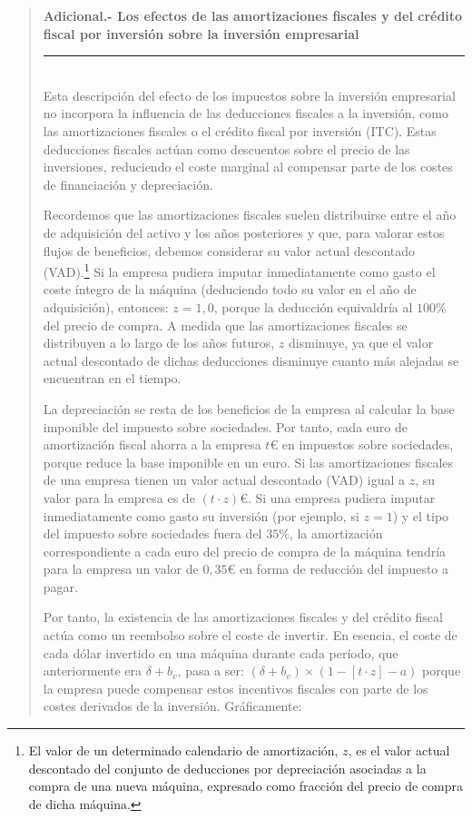 \documentclass[10pt,a4paper]{article}
\newenvironment{specialblock}[1]{%
      \begin{quote} %
      \small %
      \noindent\textbf{#1}\\[-0.3em] %
      \rule{\linewidth}{0.4pt}\\[0.6em]}{
      \end{quote}}
\begin{document}
\begin{specialblock}{\textbf{Adicional.-} Los efectos de las amortizaciones fiscales y del crédito fiscal por inversión sobre la inversión empresarial}
    Esta descripción del efecto de los impuestos sobre la inversión empresarial no incorpora la influencia de las deducciones fiscales a la inversión, como las amortizaciones fiscales o el crédito fiscal por inversión (ITC). Estas deducciones fiscales actúan como descuentos sobre el precio de las inversiones, reduciendo el coste marginal al compensar parte de los costes de financiación y depreciación.

    Recordemos que las amortizaciones fiscales suelen distribuirse entre el año de adquisición del activo y los años posteriores y que, para valorar estos flujos de beneficios, debemos considerar su valor actual descontado (VAD).\footnote{%
        El valor de un determinado calendario de amortización, $z$, es el valor actual descontado del conjunto de deducciones por depreciación asociadas a la compra de una nueva máquina, expresado como fracción del precio de compra de dicha máquina.
    } Si la empresa pudiera imputar inmediatamente como gasto el coste íntegro de la máquina (deduciendo todo su valor en el año de adquisición), entonces: $z = 1,0$, porque la deducción equivaldría al $100\%$ del precio de compra. A medida que las amortizaciones fiscales se distribuyen a lo largo de los años futuros, $z$ disminuye, ya que el valor actual descontado de dichas deducciones disminuye cuanto más alejadas se encuentran en el tiempo.
    
    La depreciación se resta de los beneficios de la empresa al calcular la base imponible del impuesto sobre sociedades. Por tanto, cada euro de amortización fiscal ahorra a la empresa $t€$ en impuestos sobre sociedades, porque reduce la base imponible en un euro. Si las amortizaciones fiscales de una empresa tienen un valor actual descontado (VAD) igual a $z$, su valor para la empresa es de $(t \cdot z)€$. Si una empresa pudiera imputar inmediatamente como gasto su inversión (por ejemplo, si $z = 1$) y el tipo del impuesto sobre sociedades fuera del $35\%$, la amortización correspondiente a cada euro del precio de compra de la máquina tendría para la empresa un valor de $0,35€$ en forma de reducción del impuesto a pagar.
    
    Por tanto, la existencia de las amortizaciones fiscales y del crédito fiscal actúa como un reembolso sobre el coste de invertir. En esencia, el coste de cada dólar invertido en una máquina durante cada período, que anteriormente era $\delta + b_v$, pasa a ser: $(\delta+ b_v) × (1 − [t \cdot z] − a)$ porque la empresa puede compensar estos incentivos fiscales con parte de los costes derivados de la inversión. Gráficamente:
    

\end{specialblock}
\end{document}
